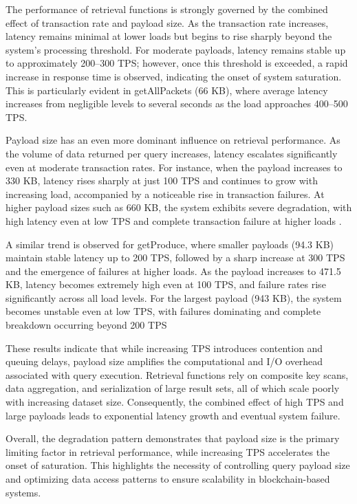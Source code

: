 \documentclass[12pt]{article}
\begin{document}
	
	The performance of retrieval functions is strongly governed by the combined effect of transaction rate and payload size. As the transaction rate increases, latency remains minimal at lower loads but begins to rise sharply beyond the system’s processing threshold. For moderate payloads, latency remains stable up to approximately 200--300 TPS; however, once this threshold is exceeded, a rapid increase in response time is observed, indicating the onset of system saturation. This is particularly evident in getAllPackets (66 KB), where average latency increases from negligible levels to several seconds as the load approaches 400--500 TPS.
	
	Payload size has an even more dominant influence on retrieval performance. As the volume of data returned per query increases, latency escalates significantly even at moderate transaction rates. For instance, when the payload increases to 330 KB, latency rises sharply at just 100 TPS and continues to grow with increasing load, accompanied by a noticeable rise in transaction failures. At higher payload sizes such as 660 KB, the system exhibits severe degradation, with high latency even at low TPS and complete transaction failure at higher loads .
	
	A similar trend is observed for getProduce, where smaller payloads (94.3 KB) maintain stable latency up to 200 TPS, followed by a sharp increase at 300 TPS and the emergence of failures at higher loads. As the payload increases to 471.5 KB, latency becomes extremely high even at 100 TPS, and failure rates rise significantly across all load levels. For the largest payload (943 KB), the system becomes unstable even at low TPS, with failures dominating and complete breakdown occurring beyond 200 TPS 
	
	These results indicate that while increasing TPS introduces contention and queuing delays, payload size amplifies the computational and I/O overhead associated with query execution. Retrieval functions rely on composite key scans, data aggregation, and serialization of large result sets, all of which scale poorly with increasing dataset size. Consequently, the combined effect of high TPS and large payloads leads to exponential latency growth and eventual system failure.
	
	Overall, the degradation pattern demonstrates that payload size is the primary limiting factor in retrieval performance, while increasing TPS accelerates the onset of saturation. This highlights the necessity of controlling query payload size and optimizing data access patterns to ensure scalability in blockchain-based systems.
	
\end{document}
